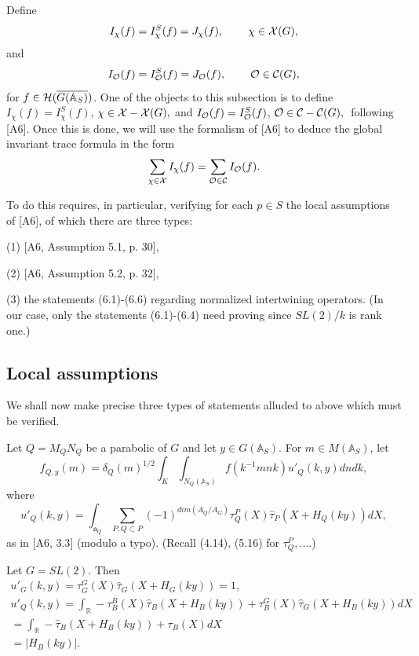 Define 
\begin{equation}
I_\chi (f)=I_\chi ^S(f)=J_\chi (f),\;\;\;\;\;\;\;\;\chi \in {\cal{X}}(G),
\end{equation}
and 
\begin{equation}
I_{{\cal{O}}}(f)=I_{{\cal{O}}}^S(f)=J_{{\cal{O}}}(f),
\;\;\;\;\;\;\;\;{\cal{O}}\in {\cal C}(G),
\end{equation}
for $f\in {\cal{H}}(\overline{G({\mathbb{A}}_S)})$. One of the objects to this subsection
is to define $I_\chi (f)=I_\chi ^S(f)$,
$\chi \in {\cal{X}}-{\cal{X}}(G), $
and $I_{{\cal{O}}}(f)=I_{{\cal{O}}}^S(f)$,
${\cal{O}}\in {\cal C}-{\cal C}(G),\;$%
following [A6]. Once this is done, we will use the formalism of [A6] to
deduce the global invariant trace formula in the form 
\begin{equation}
\sum_{\chi \in {\cal{X}}}I_\chi (f)=\sum_{{\cal{O}}\in {\cal C}}
I_{{\cal{O}}}(f).
\end{equation}

To do this requires, in particular, verifying for each $p\in S$ the local
assumptions of [A6], of which there are three types:

(1) [A6, Assumption 5.1, p. 30],

(2) [A6, Assumption 5.2, p. 32],

(3) the statements (6.1)-(6.6) regarding normalized intertwining operators.
(In our case, only the statements (6.1)-(6.4) need proving since
$SL(2)/k$ is rank one.)

\subsection{Local assumptions}

We shall now make precise three types of statements alluded to
above which must be verified.

Let $Q=M_Q N_Q$ be a parabolic of $G$ and let $y\in G({\mathbb{A}}_S)$.
For $m\in M({\mathbb{A}}_S)$, let
\begin{equation}
f_{Q,y}(m)=\delta_Q(m)^{1/2}\int_K\int_{N_Q({\mathbb{A}}_S)}
f(k^{-1}mnk)u'_Q(k,y)dndk,
\end{equation}
where
\[
u'_Q(k,y)=\int_{{\mathfrak{a}}_Q}
\sum_{ P ,Q\subset P}
(-1)^{dim(A_Q/A_G)}
\tau_Q^P(X)\hat{\tau}_P(X+H_Q(ky))dX ,
\]
as in [A6, {3.3}] (modulo a typo).
(Recall (4.14), (5.16) for $\tau_Q^P,...$.)
\begin{example} Let $G=SL(2)$. Then
\[
\begin{array}{c}
u'_G(k,y)=\tau_G^G(X)\hat{\tau}_G(X+H_G(ky))=1,\\
u'_Q(k,y)=\int_{{\mathbb{R}}}
-\tau_B^B(X)\hat{\tau}_B(X+H_B(ky))
+\tau_B^G(X)\hat{\tau}_G(X+H_B(ky)) dX \\
=\int_{{\mathbb{R}}}
-\hat{\tau}_B(X+H_B(ky))+\tau_B(X)dX\\
=|H_B(ky)|.
\end{array}
\]
\end{example}

